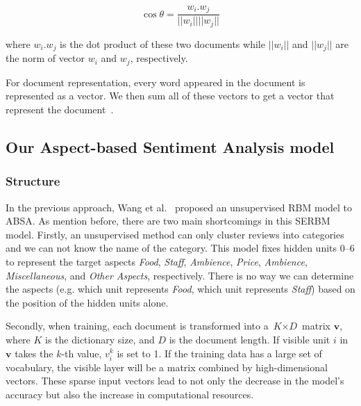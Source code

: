 \begin{equation} \label{cosine_equal}
\cos\theta=\frac{w_i.w_j}{||w_i|| ||w_j||}
\end{equation} 

where $w_i.w_j$ is the dot product of these two documents while $||w_i||$ and $||w_j||$ are the norm of vector $w_i$ and $w_j$, respectively.

For document representation, every word appeared in the document is represented as a vector.
We then sum all of these vectors to get a vector that represent the document~\cite{Quoc_Le}.

\subsection{Our Aspect-based Sentiment Analysis model}

\subsubsection{Structure}

In the previous approach, Wang et al.~\cite{serbm} proposed an unsupervised RBM model to ABSA.
As mention before, there are two main shortcomings in this SERBM model.
Firstly, an unsupervised method can only cluster reviews into categories and we can not know the name of the category.
This model fixes hidden units 0--6 to represent the target aspects \textit{Food}, \textit{Staff}, \textit{Ambience}, \textit{Price}, \textit{Ambience}, \textit{Miscellaneous}, and \textit{Other Aspects}, respectively.
There is no way we can determine the aspects (e.g. which unit represents \textit{Food}, which unit represents \textit{Staff}) based on the position of the hidden units alone.

Secondly, when training, each document is transformed into a $ \textit{K} \times \textit{D} $ matrix $\textbf{v}$, where $\textit{K}$ is the dictionary size, and $\textit{D}$ is the document length.
If visible unit $\textit{i}$ in $\textbf{v}$ takes the $\textit{k}$-th value, $v^k_i$ is set to 1.
If the training data has a large set of vocabulary, the visible layer will be a matrix combined by high-dimensional vectors.
These sparse input vectors lead to not only the decrease in the model's accuracy but also the increase in computational resources.

